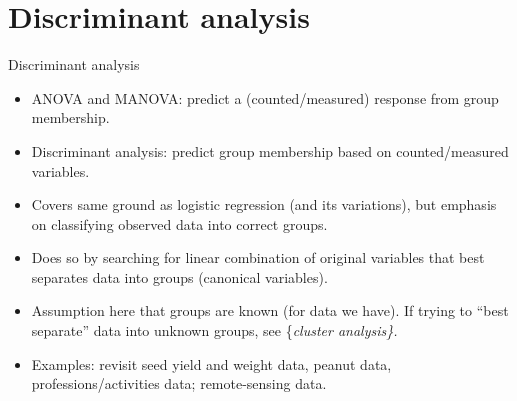 \documentclass[ignorenonframetext,]{beamer}
\begin{document}
\hypertarget{discriminant-analysis}{%
\section{Discriminant analysis}\label{discriminant-analysis}}

\begin{frame}{Discriminant analysis}
\protect\hypertarget{discriminant-analysis-1}{}

\begin{itemize}
\item
  ANOVA and MANOVA: predict a (counted/measured) response from group
  membership.
\item
  Discriminant analysis: predict group membership based on
  counted/measured variables.
\item
  Covers same ground as logistic regression (and its variations), but
  emphasis on classifying observed data into correct groups.
\item
  Does so by searching for linear combination of original variables that
  best separates data into groups (canonical variables).
\item
  Assumption here that groups are known (for data we have). If trying to
  ``best separate'' data into unknown groups, see
  \{\em cluster analysis\}.
\item
  Examples: revisit seed yield and weight data, peanut data,
  professions/activities data; remote-sensing data.
\end{itemize}

\end{frame}
\end{document}
